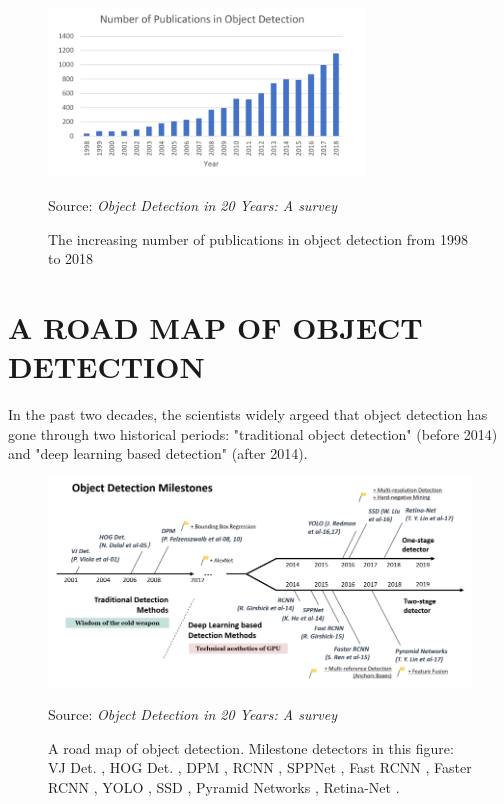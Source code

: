 \documentclass[12pt]{article}
\newcommand{\source}[1]{\caption*{Source: \emph{#1}} }
\begin{document}
\begin{figure}[htp]
    \centering
    \includegraphics[width=0.75\textwidth]{images/number_of_publication.png}
    \caption{The increasing number of publications in object detection from 1998 to 2018}
    \label{fig:publication}
    \source{Object Detection in 20 Years: A survey\cite{zou2019object}}
\end{figure}


\section{A ROAD MAP OF OBJECT DETECTION}
\label{sec:roadmap}
In the past two decades, the scientists widely argeed that object detection has 
gone through two historical periods: "traditional object detection" (before 2014)
and "deep learning based detection" (after 2014). 

\begin{figure}[htp]
    \centering
    \includegraphics[width=1\textwidth]{images/roadmap.png}
    \caption{
        A road map of object detection. Milestone detectors in this figure: 
        VJ Det. \cite{viola2001rapid, viola2004robust}, 
        HOG Det. \cite{dalal2005histograms}, 
        DPM \cite{felzenszwalb2008discriminatively, felzenszwalb2010cascade, felzenszwalb2009object}, 
        RCNN \cite{girshick2014rich}, SPPNet \cite{he2015spatial},
        Fast RCNN \cite{wang2017fast}, 
        Faster RCNN \cite{ren2015faster}, 
        YOLO \cite{redmon2016you}, 
        SSD \cite{liu2016ssd}, 
        Pyramid Networks \cite{lin2017feature}, 
        Retina-Net \cite{lin2017focal}.
    }
    \label{fig:roadmap}
    \source{Object Detection in 20 Years: A survey\cite{zou2019object}}
\end{figure}
\end{document}
